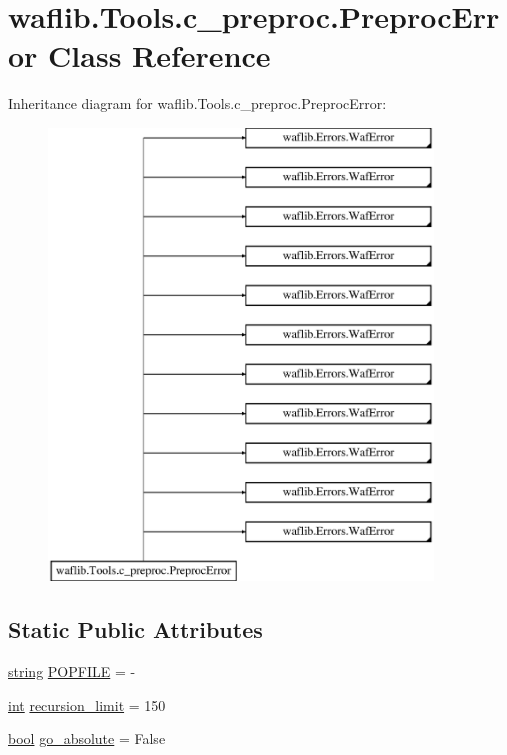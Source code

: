 \hypertarget{classwaflib_1_1_tools_1_1c__preproc_1_1_preproc_error}{}\section{waflib.\+Tools.\+c\+\_\+preproc.\+Preproc\+Error Class Reference}
\label{classwaflib_1_1_tools_1_1c__preproc_1_1_preproc_error}
Inheritance diagram for waflib.\+Tools.\+c\+\_\+preproc.\+Preproc\+Error\+:\begin{figure}[H]
\begin{center}
\leavevmode
\includegraphics[height=12.000000cm]{classwaflib_1_1_tools_1_1c__preproc_1_1_preproc_error}
\end{center}
\end{figure}
\subsection*{Static Public Attributes}
\begin{DoxyCompactItemize}
\item 
\hyperlink{test__lib_f_l_a_c_2format_8c_ab02026ad0de9fb6c1b4233deb0a00c75}{string} \hyperlink{classwaflib_1_1_tools_1_1c__preproc_1_1_preproc_error_a4230017e9053c8c47cd7de4fe72cd914}{P\+O\+P\+F\+I\+LE} = \textquotesingle{}-\/\textquotesingle{}
\item 
\hyperlink{xmltok_8h_a5a0d4a5641ce434f1d23533f2b2e6653}{int} \hyperlink{classwaflib_1_1_tools_1_1c__preproc_1_1_preproc_error_a60c23aa10c0c58d1b4525a985dd9306d}{recursion\+\_\+limit} = 150
\item 
\hyperlink{mac_2config_2i386_2lib-src_2libsoxr_2soxr-config_8h_abb452686968e48b67397da5f97445f5b}{bool} \hyperlink{classwaflib_1_1_tools_1_1c__preproc_1_1_preproc_error_a0facf8e340b5184bfdc561f822f8b9bd}{go\+\_\+absolute} = False
\end{DoxyCompactItemize}
